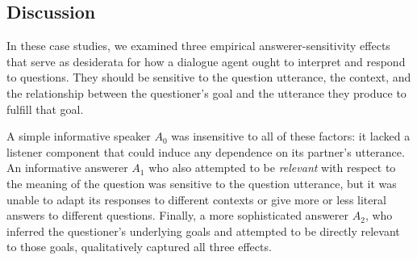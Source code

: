 \documentclass[12pt, floatsintext, jou]{apa6}
\begin{document}

\subsection{Discussion}

In these case studies, we examined three empirical answerer-sensitivity effects that serve as desiderata for how a dialogue agent ought to interpret and respond to questions. 
They should be sensitive to the question utterance, the context, and the relationship between the questioner's goal and the utterance they produce to fulfill that goal.

A simple informative speaker $A_0$ was insensitive to all of these factors: it lacked a listener component that could induce any dependence on its partner's utterance. 
An informative answerer $A_1$ who also attempted to be \emph{relevant} with respect to the meaning of the question was sensitive to the question utterance, but it was unable to adapt its responses to different contexts or give more or less literal answers to different questions. 
Finally, a more sophisticated answerer $A_2$, who inferred the questioner's underlying goals and attempted to be directly relevant to those goals, qualitatively captured all three effects.
\end{document}
